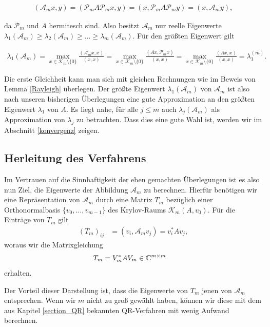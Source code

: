 \documentclass{article}
\theoremstyle{plain}
\begin{document}
\begin{align*}
	(\mathcal{A}_mx, y) = (\mathcal{P}_m A \mathcal{P}_m x, y) = (x, \mathcal{P}_m A \mathcal{P}_m y) = (x, \mathcal{A}_m y),
\end{align*}

da $\mathcal{P}_m$ und $A$ hermitesch sind. Also besitzt $ \mathcal{A}_m$ nur reelle Eigenwerte $\lambda_1(\mathcal{A}_m) \geq \lambda_2(\mathcal{A}_m) \geq \dots \geq \lambda_m(\mathcal{A}_m)$. Für den größten Eigenwert gilt

\begin{align*}
	\lambda_1(\mathcal{A}_m) = \max_{x \in \mathcal{K}_m \setminus \{0\}} \frac{(\mathcal{A}_m x, x)}{(x,x)} = \max_{x \in \mathcal{K}_m \setminus \{0\}} \frac{(Ax, \mathcal{P}_m x)}{(x,x)} = \max_{x \in \mathcal{K}_m \setminus \{0\}} \frac{(A x, x)}{(x,x)} = \lambda_1^{(m)}.
\end{align*}

Die erste Gleichheit kann man sich mit gleichen Rechnungen wie im Beweis von Lemma \ref{Rayleigh} überlegen. Der größte Eigenwert $\lambda_1(\mathcal{A}_m)$ von $\mathcal{A}_m$ ist also nach unseren bisherigen Überlegungen eine gute Approximation an den größten Eigenwert $\lambda_1$ von $A$. Es liegt nahe, für alle $j \leq m$ auch $\lambda_j(\mathcal{A}_m)$ als Approximation von $\lambda_j$ zu betrachten. Dass dies eine gute Wahl ist, werden wir im  Abschnitt \ref{konvergenz} zeigen.

\subsection{Herleitung des Verfahrens}

Im Vertrauen auf die Sinnhaftigkeit der eben gemachten Überlegungen ist es also nun Ziel, die Eigenwerte der Abbildung $\mathcal{A}_m$ zu berechnen. Hierfür benötigen wir eine Repräsentation von $\mathcal{A}_m$ durch eine Matrix $T_m$ bezüglich einer Orthonormalbasis $\{v_0, \dots, v_{m-1}\}$ des Krylov-Raums $\mathcal{K}_m(A,v_0)$. Für die Einträge von $T_m$ gilt
\begin{align*}
	(T_m)_{ij} &= (v_i, \mathcal{A}_m v_j) = v_i^*Av_j,
\end{align*}
woraus wir die Matrixgleichung
\begin{align}\label{mateq}
	T_m &= V_m^*AV_m \in \mathbb{C}^{m \times m}
\end{align}
erhalten.

Der Vorteil dieser Darstellung ist, dass die Eigenwerte von $T_m$ jenen von $\mathcal{A}_m$ entsprechen. Wenn wir $m$ nicht zu groß gewählt haben, können wir diese mit dem aus Kapitel \ref{section_QR} bekannten QR-Verfahren mit wenig Aufwand berechnen.
\end{document}
